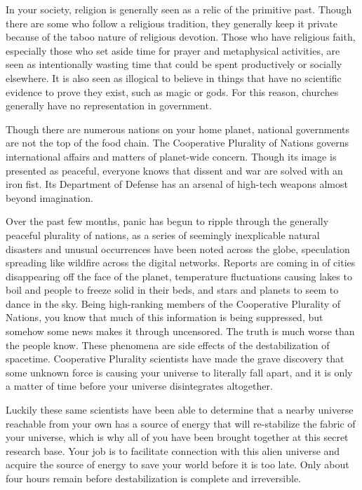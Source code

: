 \documentclass[blue]{guildcamp3}
\begin{document}
In your society, religion is generally seen as a relic of the primitive past. Though there are some who follow a religious tradition, they generally keep it private because of the taboo nature of religious devotion. Those who have religious faith, especially those who set aside time for prayer and metaphysical activities, are seen as intentionally wasting time that could be spent productively or socially elsewhere. It is also seen as illogical to believe in things that have no scientific evidence to prove they exist, such as magic or gods. For this reason, churches generally have no representation in government.

Though there are numerous nations on your home planet, national governments are not the top of the food chain. The Cooperative Plurality of Nations governs international affairs and matters of planet-wide concern. Though its image is presented as peaceful, everyone knows that dissent and war are solved with an iron fist. Its Department of Defense has an arsenal of high-tech weapons almost beyond imagination.

Over the past few months, panic has begun to ripple through the generally peaceful plurality of nations, as a series of seemingly inexplicable natural disasters and unusual occurrences have been noted across the globe, speculation spreading like wildfire across the digital networks. Reports are coming in of cities disappearing off the face of the planet, temperature fluctuations causing lakes to boil and people to freeze solid in their beds, and stars and planets to seem to dance in the sky. Being high-ranking members of the Cooperative Plurality of Nations, you know that much of this information is being suppressed, but somehow some news makes it through uncensored. The truth is much worse than the people know. These phenomena are side effects of the destabilization of spacetime. Cooperative Plurality scientists have made the grave discovery that some unknown force is causing your universe to literally fall apart, and it is only a matter of time before your universe disintegrates altogether.

Luckily these same scientists have been able to determine that a nearby universe reachable from your own has a source of energy that will re-stabilize the fabric of your universe, which is why all of you have been brought together at this secret research base. Your job is to facilitate connection with this alien universe and acquire the source of energy to save your world before it is too late. Only about four hours remain before destabilization is complete and irreversible.
\end{document}
